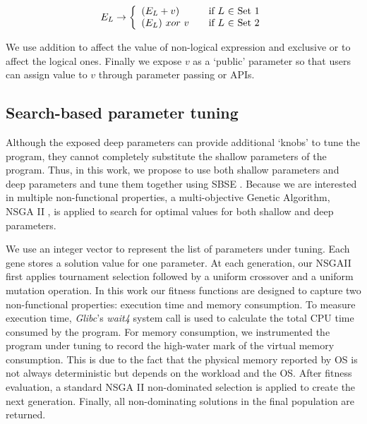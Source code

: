 \begin{equation}
 E_L \rightarrow \left\{
  \begin{array}{l l}
    (E_L + v) & \quad \text{if $L$ $\in$ Set 1}\\
    (E_L) \ xor \ v & \quad \text{if $L$ $\in$ Set 2}
    \end{array} \right.
\end{equation}

We use addition to affect the value of non-logical expression and exclusive or to affect the logical ones.
Finally we expose $v$ as a `public' parameter so that users can assign value to $v$ through parameter passing or APIs.

\subsection{Search-based parameter tuning}
\label{sec_nsgaii}

Although the exposed deep parameters can provide additional `knobs' \cite{Hoffmann:2011:DKR:1961296.1950390} to tune the program, they cannot completely substitute the shallow parameters of the program.  Thus, in this work, we propose to use both shallow parameters and deep parameters and tune them together using SBSE \cite{Harman:2007:CSF:1253532.1254729}. Because we are interested in multiple non-functional properties, a multi-objective Genetic Algorithm, NSGA II \cite{996017}, is applied to search for optimal values for both shallow and deep parameters.


We use an integer vector to represent the list of parameters under tuning. Each gene stores a solution value for one parameter. At each generation, our NSGAII first applies tournament selection followed by a uniform crossover and a uniform mutation operation. In this work our fitness functions are designed to capture two non-functional properties: execution time and memory consumption. To measure execution time, \emph{Glibc}'s \emph{wait4} system call is used to calculate the total CPU time consumed by the program. For memory consumption, we instrumented the program under tuning to record the high-water mark of the virtual memory consumption. This is due to the fact that the physical memory reported by OS is not always deterministic but depends on the workload and the OS. After fitness evaluation, a standard NSGA II non-dominated selection is applied to create the next generation. Finally, all non-dominating solutions in the final population are returned.
